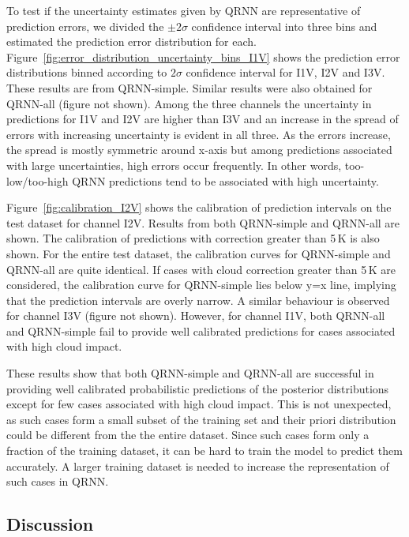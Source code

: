 \documentclass[amt, manuscript]{copernicus}
\begin{document}
To test if the uncertainty estimates given by QRNN are representative of prediction errors, we divided the $\pm2\sigma$ confidence interval into three bins and estimated the prediction error distribution for each. Figure~\ref{fig:error_distribution_uncertainty_bins_I1V} shows the prediction error distributions binned according to $2\sigma$ confidence interval for I1V, I2V and I3V. These results are from QRNN-simple. Similar results were also obtained for QRNN-all (figure not shown). Among the three channels the uncertainty in predictions for I1V and I2V are higher than I3V and an increase in the spread of errors with increasing uncertainty is evident in all three. As the errors increase, the spread is mostly symmetric around x-axis but among predictions associated with large uncertainties, high errors occur frequently. In other words, too-low/too-high QRNN predictions tend to be associated with high uncertainty. 

Figure~\ref{fig:calibration_I2V} shows the calibration of prediction intervals on the test dataset for channel I2V. Results from both QRNN-simple and QRNN-all are shown. The calibration of predictions with correction greater than 5\,K is also shown. For the entire test dataset, the calibration curves for QRNN-simple and QRNN-all are quite identical. If cases with cloud correction greater than 5\,K are considered, the calibration curve for QRNN-simple lies  below y=x line, implying that the prediction intervals are overly narrow. A similar behaviour is observed for channel I3V (figure not shown). However, for channel I1V, both QRNN-all and QRNN-simple fail to provide well calibrated predictions for cases associated with high cloud impact. 

These results show that both QRNN-simple and QRNN-all are successful in
providing well calibrated probabilistic predictions of the posterior
distributions except for few cases associated with high cloud impact. This is
not unexpected, as such cases form a small subset of the training set and their
priori distribution could be different from the the entire dataset. Since such
cases form only a fraction of the training dataset, it can be hard to train the
model to predict them accurately. A larger training dataset is needed to
increase the representation of such cases in QRNN.


\subsection{Discussion}
\end{document}
